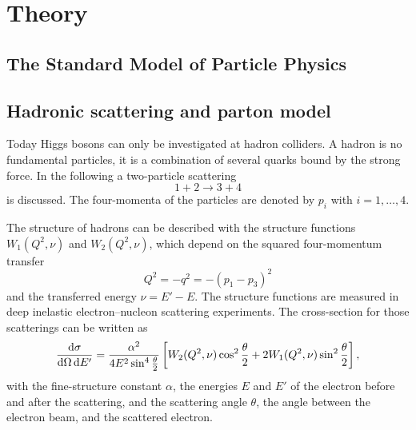 \chapter{Theory}\label{cha:theory}

\section{The Standard Model of Particle Physics}\label{sec:theory:sm}


\section{Hadronic scattering and parton model}\label{sub:theory:hadronscattering}

Today Higgs bosons can only be investigated at hadron colliders.
A hadron is no fundamental particles, it is a combination of several quarks bound by the strong force.
In the following a two-particle scattering
\begin{equation}
    1 + 2 \to 3 + 4
\end{equation}
is discussed.
The four-momenta of the particles are denoted by $p_i$ with $i = 1,\ldots,4$.

The structure of hadrons can be described with the structure functions $W_1(Q^2, \nu)$ and $W_2(Q^2, \nu)$,
which depend on the squared four-momentum transfer
\begin{equation}
    Q^2 = -q^2 = - (p_1 - p_3)^2
\end{equation}
and the transferred energy $\nu = E' - E$.
The structure functions are measured in deep inelastic electron--nucleon scattering experiments.
The cross-section for those scatterings can be written as~\cite{drell64, bjo:scaling}
\begin{equation}
    \frac{\dif \sigma}{\dif\Omega \dif E'} = \frac{\alpha^2}{4 E^2 \sin^4 \frac{\theta}{2}}
    \left[ W_2(Q^2, \nu) \cos^2 \frac{\theta}{2} + 2 W_1(Q^2, \nu) \sin^2 \frac{\theta}{2} \right ],
\end{equation}
with the fine-structure constant $\alpha$, the energies $E$ and $E'$ of the electron before and after the scattering,
and the scattering angle $\theta$, the angle between the electron beam, and the scattered electron.

